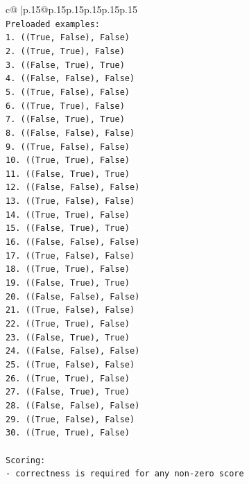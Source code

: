 \documentclass{article}
\begin{document}
{\begin{supertabular}{c@{$\;$}|p{.15\linewidth}@{}p{.15\linewidth}p{.15\linewidth}p{.15\linewidth}p{.15\linewidth}p{.15\linewidth}}
{{{\\ 
\texttt{Preloaded examples:} \\
\texttt{1. ((True, False), False)} \\
\texttt{2. ((True, True), False)} \\
\texttt{3. ((False, True), True)} \\
\texttt{4. ((False, False), False)} \\
\texttt{5. ((True, False), False)} \\
\texttt{6. ((True, True), False)} \\
\texttt{7. ((False, True), True)} \\
\texttt{8. ((False, False), False)} \\
\texttt{9. ((True, False), False)} \\
\texttt{10. ((True, True), False)} \\
\texttt{11. ((False, True), True)} \\
\texttt{12. ((False, False), False)} \\
\texttt{13. ((True, False), False)} \\
\texttt{14. ((True, True), False)} \\
\texttt{15. ((False, True), True)} \\
\texttt{16. ((False, False), False)} \\
\texttt{17. ((True, False), False)} \\
\texttt{18. ((True, True), False)} \\
\texttt{19. ((False, True), True)} \\
\texttt{20. ((False, False), False)} \\
\texttt{21. ((True, False), False)} \\
\texttt{22. ((True, True), False)} \\
\texttt{23. ((False, True), True)} \\
\texttt{24. ((False, False), False)} \\
\texttt{25. ((True, False), False)} \\
\texttt{26. ((True, True), False)} \\
\texttt{27. ((False, True), True)} \\
\texttt{28. ((False, False), False)} \\
\texttt{29. ((True, False), False)} \\
\texttt{30. ((True, True), False)} \\
\\ 
\texttt{Scoring:} \\
\texttt{{-} correctness is required for any non{-}zero score} \\
}}}
\end{supertabular}}
\end{document}
